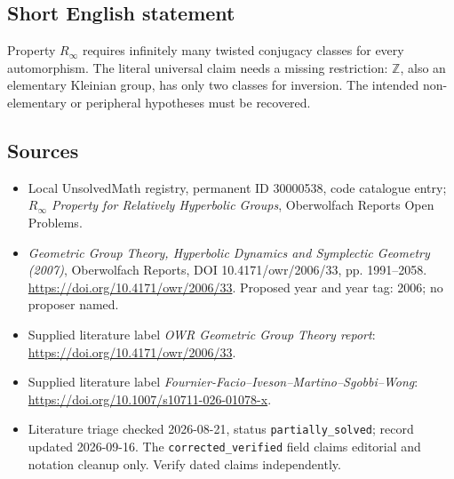 \documentclass[11pt]{article}
\newcommand{\Z}{\mathbb{Z}}
\begin{document}
\subsection{Short English statement}
Property \(R_\infty\) requires infinitely many twisted conjugacy classes for every automorphism. The literal universal claim needs a missing restriction: \(\Z\), also an elementary Kleinian group, has only two classes for inversion. The intended non-elementary or peripheral hypotheses must be recovered.
\subsection{Sources}
\begin{itemize}\item Local UnsolvedMath registry, permanent ID 30000538, code catalogue entry; \emph{\(R_\infty\) Property for Relatively Hyperbolic Groups}, Oberwolfach Reports Open Problems.\item \emph{Geometric Group Theory, Hyperbolic Dynamics and Symplectic Geometry (2007)}, Oberwolfach Reports, DOI 10.4171/owr/2006/33, pp. 1991--2058. \url{https://doi.org/10.4171/owr/2006/33}. Proposed year and year tag: 2006; no proposer named.\item Supplied literature label \emph{OWR Geometric Group Theory report}: \url{https://doi.org/10.4171/owr/2006/33}.\item Supplied literature label \emph{Fournier-Facio--Iveson--Martino--Sgobbi--Wong}: \url{https://doi.org/10.1007/s10711-026-01078-x}.\item Literature triage checked 2026-08-21, status \texttt{partially\_solved}; record updated 2026-09-16. The \texttt{corrected\_verified} field claims editorial and notation cleanup only. Verify dated claims independently.\end{itemize}
\end{document}
